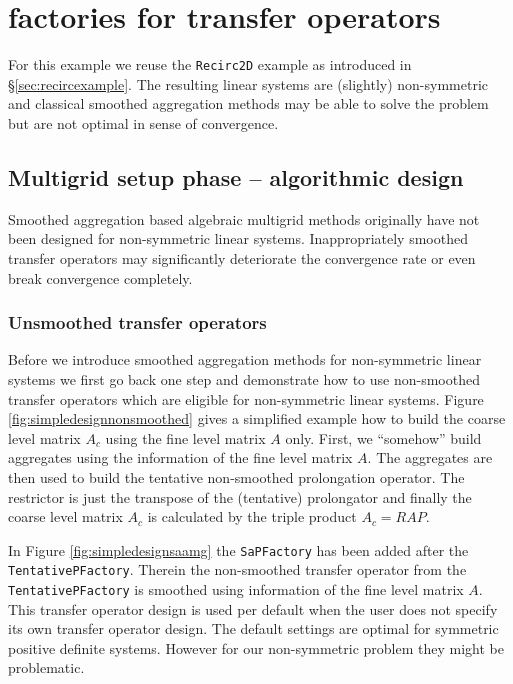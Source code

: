 \documentclass[10pt,fleqn]{book}
\begin{document}
\chapter{\muelu factories for transfer operators}

For this example we reuse the \verb|Recirc2D| example as introduced in \S\ref{sec:recircexample}. The resulting linear systems are (slightly) non-symmetric and classical smoothed aggregation methods may be able to solve the problem but are not optimal in sense of convergence.

\section{Multigrid setup phase -- algorithmic design}

Smoothed aggregation based algebraic multigrid methods originally have not been designed for non-symmetric linear systems. Inappropriately smoothed transfer operators may significantly deteriorate the convergence rate or even break convergence completely.

\subsection{Unsmoothed transfer operators}
Before we introduce smoothed aggregation methods for non-symmetric linear systems we first go back one step and demonstrate how to use non-smoothed transfer operators which are eligible for non-symmetric linear systems. Figure \ref{fig:simpledesignnonsmoothed} gives a simplified example how to build the coarse level matrix $A_c$ using the fine level matrix $A$ only. First, we ``somehow'' build aggregates using the information of the fine level matrix $A$. The aggregates are then used to build the tentative non-smoothed prolongation operator. The restrictor is just the transpose of the (tentative) prolongator and finally the coarse level matrix $A_c$ is calculated by the triple product $A_c=RAP$.

In Figure \ref{fig:simpledesignsaamg} the \verb|SaPFactory| has been added after the \verb|TentativePFactory|. Therein the non-smoothed transfer operator from the \verb|TentativePFactory| is smoothed using information of the fine level matrix $A$. This transfer operator design is used per default when the user does not specify its own transfer operator design. The default settings are optimal for symmetric positive definite systems. However for our non-symmetric problem they might be problematic.
\end{document}
